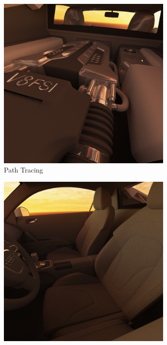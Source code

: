 		\begin{figure}[h]
			\begin{subfigure}[t]{0.5\textwidth}
				\center
				\includegraphics[width=0.95\textwidth]{pic/irr_est-ra-r8_3-ref.png}
				\caption{Path Tracing}
			\end{subfigure}
			\begin{subfigure}[t]{0.5\textwidth}
				\center
				\includegraphics[width=0.95\textwidth]{pic/irr_est-ra-r8_4-ref.png}

\end{subfigure}
\end{figure}

